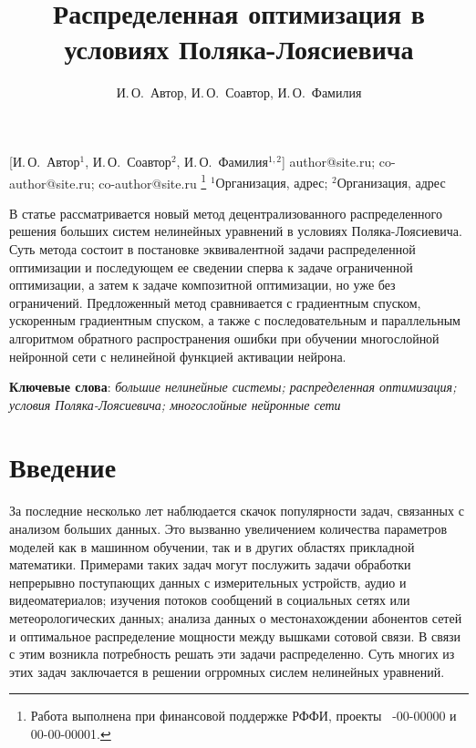 \documentclass[12pt, twoside]{article}
\newcommand{\alexanderb}[1]{\todo[inline]{{\textbf{Alexander B.:} \emph{#1}}}}
\begin{document}
\title
    [Распределенная оптимизация в условиях Поляка-Лоясиевича] %
    {Распределенная оптимизация в условиях Поляка-Лоясиевича}
\author
    [И.\,О.~Автор] %
    {И.\,О.~Автор, И.\,О.~Соавтор, И.\,О.~Фамилия} %
    [И.\,О.~Автор$^1$, И.\,О.~Соавтор$^2$, И.\,О.~Фамилия$^{1,2}$] %
\email
    {author@site.ru; co-author@site.ru;  co-author@site.ru}
\thanks
    {Работа выполнена при
     финансовой поддержке РФФИ, проекты \No\ -00-00000 и 00-00-00001.}
\organization
    {$^1$Организация, адрес; $^2$Организация, адрес}
\abstract
    {В статье рассматривается новый метод децентрализованного распределенного решения больших систем нелинейных уравнений в условиях Поляка-Лоясиевича. Суть метода состоит в постановке эквивалентной задачи распределенной оптимизации и последующем ее сведении сперва к задаче ограниченной оптимизации, а затем к задаче композитной оптимизации, но уже без ограничений. 
    Предложенный метод сравнивается с градиентным спуском, ускоренным градиентным спуском, а также с последовательным и параллельным алгоритмом обратного распространения ошибки при обучении многослойной нейронной сети с нелинейной функцией активации нейрона. 
	
\bigskip
\noindent
\textbf{Ключевые слова}: \emph {большие нелинейные системы; распределенная оптимизация; условия Поляка-Лоясиевича; многослойные нейронные сети}
}




\maketitle
\linenumbers

\section{Введение}
За последние несколько лет наблюдается скачок популярности задач, связанных с анализом больших данных. Это вызванно увеличением количества параметров моделей как в машинном обучении, так и в других областях прикладной математики. Примерами таких задач могут послужить задачи обработки непрерывно поступающих данных с измерительных устройств, аудио и видеоматериалов; изучения потоков сообщений в социальных сетях или метеорологических данных; анализа данных о местонахождении абонентов сетей и оптимальное распределение мощности между вышками сотовой связи. В связи с этим возникла потребность решать эти задачи распределенно. Суть многих из этих задач заключается в решении огрромных сислем нелинейных уравнений. 
\end{document}
